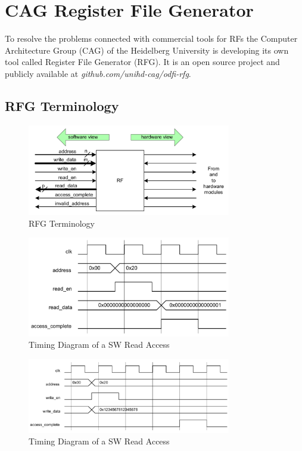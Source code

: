 \section{CAG Register File Generator}
To resolve the problems connected with commercial tools for RFs the Computer Architecture Group (CAG) of the Heidelberg University is developing its own tool called Register File Generator (RFG). It is an open source project and publicly available at \emph{github.com/unihd-cag/odfi-rfg}.

\subsection{RFG Terminology}

\begin{figure}[h]
 \centering
 \includegraphics[width=252pt]{images/rf_view.png}
 \caption{RFG Terminology \cite{leber_diss}}
\label{fig::rfg_view}
\end{figure}

\begin{figure}[h]
 \centering
 \includegraphics[width=252pt]{images/sw_read_timing.png}
 \caption{Timing Diagram of a SW Read Access \cite{leber_diss}}
\label{fig::sw_read}
\end{figure}

\begin{figure}[h]
 \centering
 \includegraphics[width=252pt]{images/sw_write_timing.png}
 \caption{Timing Diagram of a SW Read Access \cite{leber_diss}}
\label{fig::sw_write}
\end{figure}

